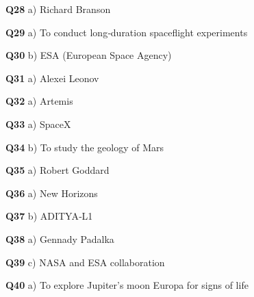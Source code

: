 \textbf{Q28} a) Richard Branson\par
\textbf{Q29} a) To conduct long‑duration spaceflight experiments\par
\textbf{Q30} b) ESA (European Space Agency)\par
\textbf{Q31} a) Alexei Leonov\par
\textbf{Q32} a) Artemis\par
\textbf{Q33} a) SpaceX\par
\textbf{Q34} b) To study the geology of Mars\par
\textbf{Q35} a) Robert Goddard\par
\textbf{Q36} a) New Horizons\par
\textbf{Q37} b) ADITYA‑L1\par
\textbf{Q38} a) Gennady Padalka\par
\textbf{Q39} c) NASA and ESA collaboration\par
\textbf{Q40} a) To explore Jupiter's moon Europa for signs of life\par
